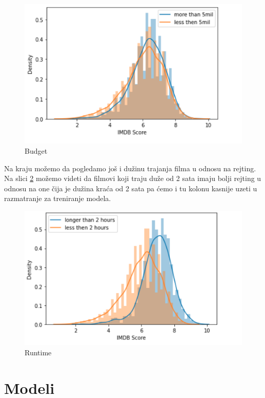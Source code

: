 \documentclass[a4paper]{article}
\begin{document}
\begin{figure}[h!]
\begin{center}
\includegraphics[scale=0.5]{budget.png}
\caption{Budget}
\label{fig:budget}
\end{center}
\end{figure}

Na kraju možemo da pogledamo još i dužinu trajanja filma u odnosu na rejting. Na slici \ref{fig:runtime} možemo videti da filmovi koji traju duže od 2 sata imaju bolji rejting u odnosu na one čija je dužina kraća od 2 sata pa ćemo i tu kolonu kasnije uzeti u razmatranje za treniranje modela.
\begin{figure}[h!]
\begin{center}
\includegraphics[scale=0.5]{runtime.png}
\caption{Runtime}
\label{fig:runtime}
\end{center}
\end{figure}


\section{Modeli}
\label{sec:modeli}
\end{document}
